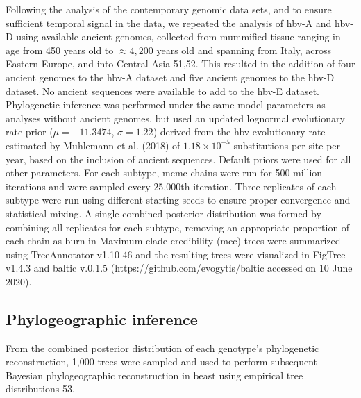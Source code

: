 Following the analysis of the contemporary genomic data sets, and to ensure sufficient temporal signal in the data, we repeated the analysis of \gls{hbv}-A and \gls{hbv}-D using available ancient genomes, collected from mummified tissue ranging in age from 450 years old to $\approx4,200$ years old and spanning from Italy, across Eastern Europe, and into Central Asia 51,52.
This resulted in the addition of four ancient genomes to the \gls{hbv}-A dataset and five ancient genomes to the \gls{hbv}-D dataset.
No ancient sequences were available to add to the \gls{hbv}-E dataset.
Phylogenetic inference was performed under the same model parameters as analyses without ancient genomes, but used an updated lognormal evolutionary rate prior ($\mu=-11.3474$, $\sigma=1.22$) derived from the \gls{hbv} evolutionary rate estimated by Muhlemann et al. (2018) of $1.18 \times 10^{-5}$ substitutions per site per year, based on the inclusion of ancient sequences.
Default priors were used for all other parameters.
For each subtype, \gls{mcmc} chains were run for 500 million iterations and were sampled every 25,000th iteration.
Three replicates of each subtype were run using different starting seeds to ensure proper convergence and statistical mixing.
A single combined posterior distribution was formed by combining all replicates for each subtype, removing an appropriate proportion of each chain as burn-in
 Maximum clade credibility (\gls{mcc}) trees were summarized using TreeAnnotator v1.10 46 and the resulting trees were visualized in FigTree v1.4.3 and baltic v.0.1.5 (https://github.com/evogytis/baltic accessed on 10 June 2020).

\subsection{Phylogeographic inference}
From the combined posterior distribution of each genotype's phylogenetic reconstruction, 1,000 trees were sampled and used to perform subsequent Bayesian phylogeographic reconstruction in \gls{beast} using empirical tree distributions 53.\\

